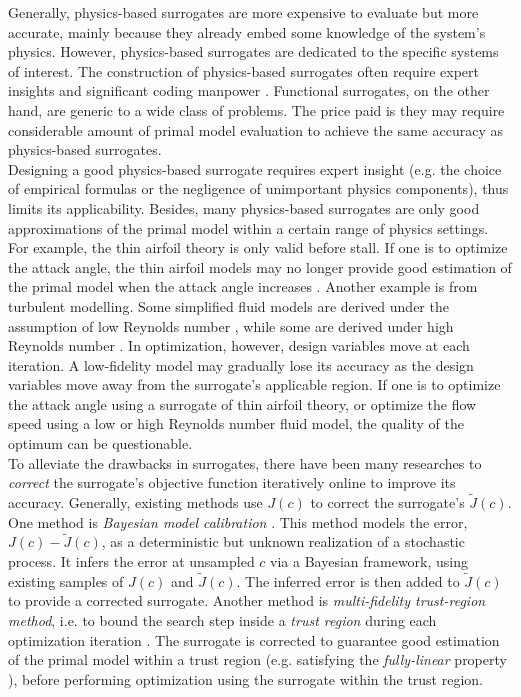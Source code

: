 \documentclass[a4paper,onecolumn]{article}
\theoremstyle{remark}
\begin{document}
\noindent Generally, physics-based surrogates are more expensive to evaluate but more accurate,
mainly because they already embed some knowledge of the system's physics. 
However, physics-based surrogates are dedicated to the specific systems of interest.
The construction of physics-based surrogates often require expert insights
and significant coding manpower \cite{Opt Koziel Book}. 
Functional surrogates, on the other hand, are generic to a wide class of problems.
The price paid is they may require considerable amount of primal model evaluation 
to achieve the same accuracy as physics-based surrogates. \\

\noindent Designing a good physics-based surrogate requires expert insight
(e.g. the choice of empirical formulas or the negligence of unimportant physics components),
thus limits its applicability. Besides,
many physics-based surrogates are only good approximations of the primal model
within a certain range of physics settings. 
For example, the thin airfoil theory is only valid before stall. 
If one is to optimize the attack angle, the thin airfoil models may no longer 
provide good estimation of the primal model when the attack angle increases \cite{thin airfoil}.
Another example is from turbulent modelling.
Some simplified fluid models are derived under the assumption of low Reynolds number
\cite{turbulent modeling R low}, while some are derived under high Reynolds number 
\cite{turbulent modeling R high}.
In optimization, however, design variables 
move at each iteration. A low-fidelity model may gradually lose its accuracy 
as the design variables move away from the surrogate's applicable region.
If one is to optimize the attack angle using a surrogate of thin airfoil theory, 
or optimize the flow speed using a low or high Reynolds number fluid model, 
the quality of the optimum can be questionable.\\

\noindent To alleviate the drawbacks in surrogates, 
there have been many researches to \emph{correct} the surrogate's objective function
iteratively online to improve its accuracy. Generally, existing methods
use $J(c)$ to correct the surrogate's $\tilde{J}(c)$.
One method is \emph{Bayesian model calibration}
\cite{KennedyOhagan1, andrewras}. This method models the error,
$J(c) - \tilde{J}(c)$, as a deterministic but unknown  
realization of a stochastic process.
It infers the error at unsampled $c$ via a Bayesian framework,
using existing samples of $J(c)$ and $\tilde{J}(c)$.
The inferred error is then added to $\tilde{J}(c)$ to provide a corrected surrogate.
Another method is \emph{multi-fidelity trust-region method}, i.e. to bound the search step
inside a \emph{trust region} during each optimization iteration \cite{trustregionwild}.
The surrogate is corrected to guarantee good estimation
of the primal model within a trust region
(e.g. satisfying the \emph{fully-linear} property \cite{trustregionconn}),
before performing optimization using the surrogate within the trust region.\\
\end{document}
